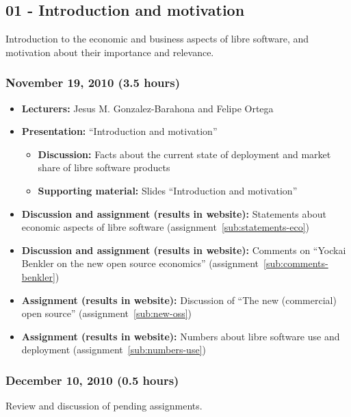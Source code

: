 \documentclass[a4paper]{article}
\begin{document}
\subsection{01 - Introduction and motivation}

Introduction to the economic and business aspects of libre software, and motivation about their importance and relevance.

\subsubsection{November 19, 2010 (3.5 hours)}

\begin{itemize}
\item \textbf{Lecturers:} Jesus M. Gonzalez-Barahona and Felipe Ortega
\item \textbf{Presentation:} ``Introduction and motivation''
  \begin{itemize}
  \item \textbf{Discussion:} Facts about the current state of deployment and market share of libre software products
  \item \textbf{Supporting material:} Slides ``Introduction and motivation''
  \end{itemize}
\item \textbf{Discussion and assignment (results in website):} Statements about economic aspects of libre software (assignment~\ref{sub:statements-eco})
\item \textbf{Discussion and assignment (results in website):} Comments on ``Yockai Benkler on the new open source economics'' (assignment~\ref{sub:comments-benkler})
\item \textbf{Assignment (results in website):} Discussion of ``The new (commercial) open source'' (assignment~\ref{sub:new-oss})
\item \textbf{Assignment (results in website):} Numbers about libre software use and deployment (assignment~\ref{sub:numbers-use})
\end{itemize}

\subsubsection{December 10, 2010 (0.5 hours)}

Review and discussion of pending assignments.
\end{document}
